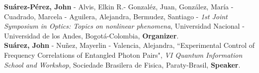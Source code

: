 \documentclass[10pt, a4paper]{article}
\newcommand{\years}[1]{\marginnote{\scriptsize #1}}
\begin{document}




\years{2018}\textbf{Suárez-Pérez, John} - Alvis, Elkin R.- Gonzaléz, Juan, González, María - Cuadrado, Marcela - Aguilera, Alejandra, Bermudez, Santiago - \emph{1st Joint Symposium in Optics: Topics on nonlinear phenomena}, Universidad Nacional - Universidad de los Andes, Bogotá-Colombia, \textbf{Organizer}.\\



\years{2017}\textbf{Suárez, John} - Nuñez, Mayerlin - Valencia, Alejandra, “Experimental Control of Frequency Correlations of Entangled Photon Pairs", \emph{VI Quantum Information School and Workshop}, Sociedade Brasilera de Fisica, Paraty-Brasil, \textbf{Speaker}.\\
\end{document}
